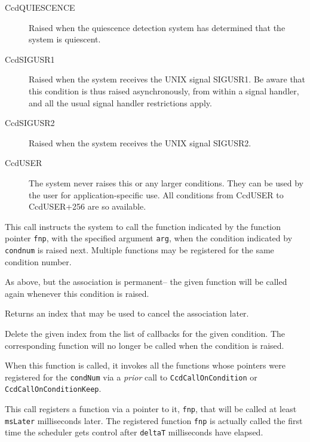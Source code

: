 \begin{description}
\item[CcdQUIESCENCE] Raised when the quiescence detection system
has determined that the system is quiescent.
\item[CcdSIGUSR1] Raised when the system receives the UNIX signal SIGUSR1.
Be aware that this condition is thus raised asynchronously, from
within a signal handler, and all the usual signal handler restrictions apply.
\item[CcdSIGUSR2] Raised when the system receives the UNIX signal SIGUSR2.
\item[CcdUSER] The system never raises this or any larger conditions.
They can be used by the user for application-specific use.  All conditions
from CcdUSER to CcdUSER+256 are so available.
\end{description}


This call instructs the system to call the function indicated by the
function pointer {\tt fnp}, with the specified argument {\tt arg}, when the
condition indicated by {\tt condnum} is raised next. Multiple functions may
be registered for the same condition number.

As above, but the association is permanent-- the given function will
be called again whenever this condition is raised.

Returns an index that may be used to cancel the association later.

Delete the given index from the list of callbacks for
the given condition. The corresponding function will no longer be 
called when the condition is raised.


When this function is called, it invokes all the functions whose
pointers were registered for the \verb#condNum# via a {\em prior} call
to {\tt CcdCallOnCondition} or {\tt CcdCallOnConditionKeep}.  


This call registers a function via a pointer to it, {\tt fnp},  that will be
called at least {\tt msLater} milliseconds later. 
The registered function {\tt fnp} is actually called the first time the
scheduler gets control after {\tt deltaT} milliseconds have elapsed. 

